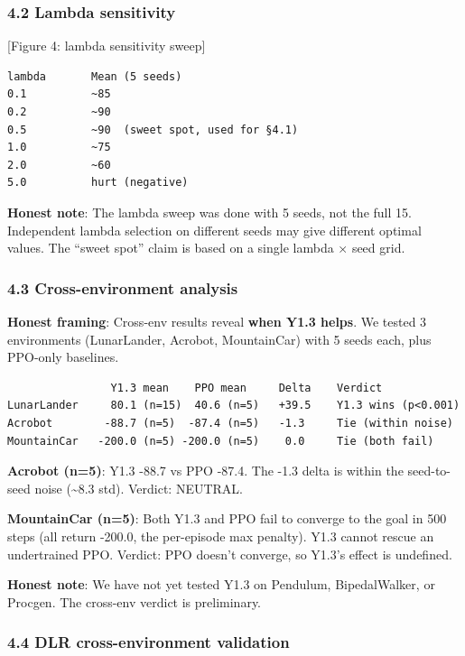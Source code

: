 \documentclass[
]{article}
\begin{document}
\subsubsection{4.2 Lambda sensitivity}\label{lambda-sensitivity}

{[}Figure 4: lambda sensitivity sweep{]}

\begin{verbatim}
lambda       Mean (5 seeds)
0.1          ~85
0.2          ~90
0.5          ~90  (sweet spot, used for §4.1)
1.0          ~75
2.0          ~60
5.0          hurt (negative)
\end{verbatim}

\textbf{Honest note}: The lambda sweep was done with 5 seeds, not the
full 15. Independent lambda selection on different seeds may give
different optimal values. The ``sweet spot'' claim is based on a single
lambda × seed grid.

\subsubsection{4.3 Cross-environment
analysis}\label{cross-environment-analysis}

\textbf{Honest framing}: Cross-env results reveal \textbf{when Y1.3
helps}. We tested 3 environments (LunarLander, Acrobot, MountainCar)
with 5 seeds each, plus PPO-only baselines.

\begin{verbatim}
                Y1.3 mean    PPO mean     Delta    Verdict
LunarLander     80.1 (n=15)  40.6 (n=5)   +39.5    Y1.3 wins (p<0.001)
Acrobot        -88.7 (n=5)  -87.4 (n=5)   -1.3     Tie (within noise)
MountainCar   -200.0 (n=5) -200.0 (n=5)    0.0     Tie (both fail)
\end{verbatim}

\textbf{Acrobot (n=5)}: Y1.3 -88.7 vs PPO -87.4. The -1.3 delta is
within the seed-to-seed noise (\textasciitilde8.3 std). Verdict:
NEUTRAL.

\textbf{MountainCar (n=5)}: Both Y1.3 and PPO fail to converge to the
goal in 500 steps (all return -200.0, the per-episode max penalty). Y1.3
cannot rescue an undertrained PPO. Verdict: PPO doesn't converge, so
Y1.3's effect is undefined.

\textbf{Honest note}: We have not yet tested Y1.3 on Pendulum,
BipedalWalker, or Procgen. The cross-env verdict is preliminary.

\subsubsection{4.4 DLR cross-environment
validation}\label{dlr-cross-environment-validation}
\end{document}
